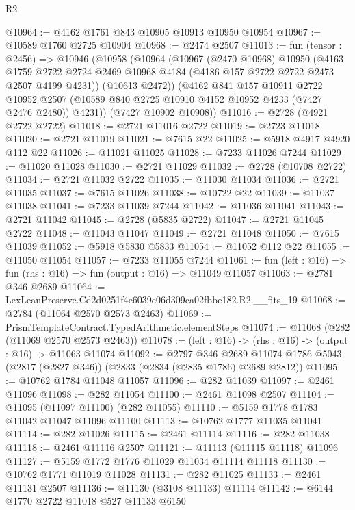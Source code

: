 \begin{lexlean}{R2}
\begin{coremodule}
@10964 := @4162 @1761 @843 @10905 @10913 @10950 @10954
@10967 := @10589 @1760 @2725 @10904
@10968 := @2474 @2507
@11013 := fun (tensor : @2456) =>
  @10946
    (@10958
      (@10964
        (@10967
          (@2470 @10968)
          @10950
          (@4163
            @1759
            @2722
            @2724
            @2469
            @10968
            @4184
            (@4186 @157 @2722 @2722 @2473 @2507 @4199 @4231))
          (@10613 @2472))
        (@4162
          @841
          @157
          @10911
          @2722
          @10952
          @2507
          (@10589 @840 @2725 @10910 @4152 @10952 @4233 (@7427 @2476 @2480))
          @4231))
      (@7427 @10902 @10908))
@11016 := @2728 (@4921 @2722 @2722)
@11018 := @2721 @11016 @2722
@11019 := @2723 @11018
@11020 := @2721 @11019
@11021 := @7615 @22
@11025 := @5918 @4917 @4920 @112 @22
@11026 := @11021 @11025
@11028 := @7233 @11026 @7244
@11029 := @11020 @11028
@11030 := @2721 @11029
@11032 := @2728 (@10708 @2722)
@11034 := @2721 @11032 @2722
@11035 := @11030 @11034
@11036 := @2721 @11035
@11037 := @7615 @11026
@11038 := @10722 @22
@11039 := @11037 @11038
@11041 := @7233 @11039 @7244
@11042 := @11036 @11041
@11043 := @2721 @11042
@11045 := @2728 (@5835 @2722)
@11047 := @2721 @11045 @2722
@11048 := @11043 @11047
@11049 := @2721 @11048
@11050 := @7615 @11039
@11052 := @5918 @5830 @5833
@11054 := @11052 @112 @22
@11055 := @11050 @11054
@11057 := @7233 @11055 @7244
@11061 := fun (left : @16) => fun (rhs : @16) => fun (output : @16) => @11049 @11057
@11063 := @2781 @346 @2689
@11064 := LexLeanPreserve.Cd2d0251f4e6039e06d309ca02fbbe182.R2.__fits_19
@11068 := @2784 (@11064 @2570 @2573 @2463)
@11069 := PrismTemplateContract.TypedArithmetic.elementSteps
@11074 := @11068 (@282 (@11069 @2570 @2573 @2463))
@11078 := (left : @16) -> (rhs : @16) -> (output : @16) -> @11063 @11074
@11092 := @2797
    @346
    @2689
    @11074
    @1786
    @5043
    (@2817 (@2827 @346))
    (@2833 (@2834 (@2835 @1786) @2689 @2812))
@11095 := @10762 @1784 @11048 @11057
@11096 := @282 @11039
@11097 := @2461 @11096
@11098 := @282 @11054
@11100 := @2461 @11098 @2507
@11104 := @11095 (@11097 @11100) (@282 @11055)
@11110 := @5159 @1778 @1783 @11042 @11047 @11096 @11100
@11113 := @10762 @1777 @11035 @11041
@11114 := @282 @11026
@11115 := @2461 @11114
@11116 := @282 @11038
@11118 := @2461 @11116 @2507
@11121 := @11113 (@11115 @11118) @11096
@11127 := @5159 @1772 @1776 @11029 @11034 @11114 @11118
@11130 := @10762 @1771 @11019 @11028
@11131 := @282 @11025
@11133 := @2461 @11131 @2507
@11136 := @11130 (@3108 @11133) @11114
@11142 := @6144 @1770 @2722 @11018 @527 @11133 @6150

\end{coremodule}
\end{lexlean}
